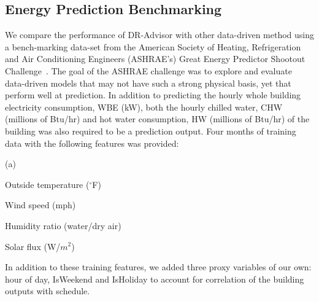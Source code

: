 \documentclass{sig-alternate-ipsn13}
\theoremstyle{definition}
\begin{document}
\subsection{Energy Prediction Benchmarking}
\label{sec:ashrae}
We compare the performance of DR-Advisor with other data-driven method using a bench-marking data-set from the American Society of Heating, Refrigeration and Air Conditioning Engineers (ASHRAE's) Great Energy Predictor Shootout Challenge~\cite{kreider1994predicting}. 
The goal of the ASHRAE challenge  was to explore and evaluate data-driven models that may not have such a strong physical basis, yet that perform well at prediction.
In addition to predicting the hourly whole building electricity consumption, WBE (kW), both the hourly chilled water, CHW (millions of Btu/hr) and hot water consumption, HW (millions of Btu/hr) of the building was also required to be a prediction output. Four months of training data with the following features was provided: 
\begin{inparaenum}(a)
\item Outside temperature ($^\circ$F)
\item Wind speed (mph)
\item Humidity ratio (water/dry air)
\item Solar flux (W/$m^2$)
\end{inparaenum}
In addition to these training features, we added three proxy variables of our own: hour of day, IsWeekend and IsHoliday to account for correlation of the building outputs with schedule. 

\begin{table}
\centering
\caption{ASHRAE Energy Prediction Competition Results}
\vspace{3pt}
    \label{tab:results}
\end{table}
\end{document}
